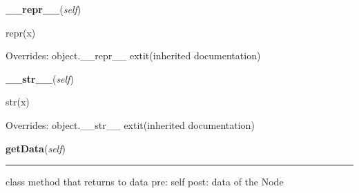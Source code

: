     \vspace{0.5ex}

\hspace{.8\funcindent}\begin{boxedminipage}{\funcwidth}

    \raggedright \textbf{\_\_repr\_\_}(\textit{self})

\setlength{\parskip}{2ex}
    repr(x)

\setlength{\parskip}{1ex}
      Overrides: object.\_\_repr\_\_ 	extit{(inherited documentation)}

    \end{boxedminipage}

    \vspace{0.5ex}

\hspace{.8\funcindent}\begin{boxedminipage}{\funcwidth}

    \raggedright \textbf{\_\_str\_\_}(\textit{self})

\setlength{\parskip}{2ex}
    str(x)

\setlength{\parskip}{1ex}
      Overrides: object.\_\_str\_\_ 	extit{(inherited documentation)}

    \end{boxedminipage}

    \label{coinor:blimpy:LinkedList':Node:getData}

    \vspace{0.5ex}

\hspace{.8\funcindent}\begin{boxedminipage}{\funcwidth}

    \raggedright \textbf{getData}(\textit{self})

    \vspace{-1.5ex}

    \rule{\textwidth}{0.5\fboxrule}
\setlength{\parskip}{2ex}
    class method that returns to data pre: self post: data of the Node

\setlength{\parskip}{1ex}
    \end{boxedminipage}

    \label{coinor:blimpy:LinkedList':Node:getNext}

